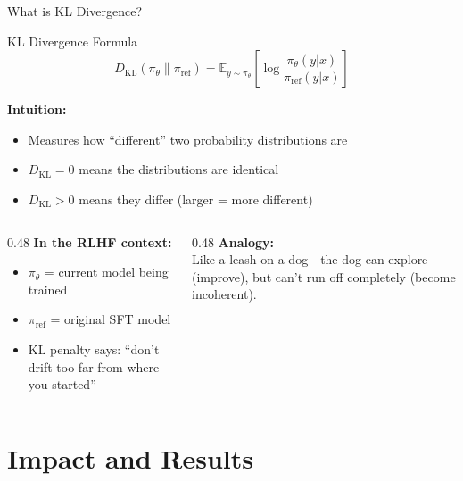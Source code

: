 \documentclass[aspectratio=169,11pt]{beamer}
\begin{document}
\begin{frame}{What is KL Divergence?}
\begin{block}{KL Divergence Formula}
\[
D_{\text{KL}}(\pi_\theta \| \pi_{\text{ref}}) = \mathbb{E}_{y \sim \pi_\theta} \left[ \log \frac{\pi_\theta(y|x)}{\pi_{\text{ref}}(y|x)} \right]
\]
\end{block}

\textbf{Intuition:}
\begin{itemize}
    \item Measures how ``different'' two probability distributions are
    \item $D_{\text{KL}} = 0$ means the distributions are identical
    \item $D_{\text{KL}} > 0$ means they differ (larger = more different)
\end{itemize}

\vspace{0.3cm}
\begin{columns}[T]
\begin{column}{0.48\textwidth}
\textbf{In the RLHF context:}
\begin{itemize}
    \item $\pi_\theta$ = current model being trained
    \item $\pi_{\text{ref}}$ = original SFT model
    \item KL penalty says: ``don't drift too far from where you started''
\end{itemize}
\end{column}
\begin{column}{0.48\textwidth}
\textbf{Analogy:}\\
Like a leash on a dog---the dog can explore (improve), but can't run off completely (become incoherent).
\end{column}
\end{columns}
\end{frame}

\section{Impact and Results}
\end{document}
